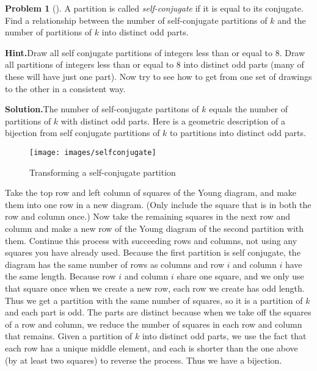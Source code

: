 \documentclass[10pt,]{book}
\theoremstyle{plain}
\theoremstyle{definition}
\newtheorem{activity}[project]{Problem}
\theoremstyle{definition}
\numberwithin{equation}{chapter}
\begin{document}
\begin{activity}[]\label{activity-165}
A partition is called \emph{self-conjugate} if it is equal to its conjugate. Find a relationship between the number of self-conjugate partitions of \(k\) and the number of partitions of \(k\) into distinct odd parts.%
\par\medskip\noindent%
\textbf{Hint.}\quad Draw all self conjugate partitions of integers less than or equal to 8.  Draw all partitions of integers less than or equal to 8 into distinct odd parts (many of these will have just one part). Now try to see how to get from one set of drawings to the other in a consistent way.%
\par\medskip\noindent%
\textbf{Solution.}\quad The number of self-conjugate partitons of \(k\) equals the number of partitions of \(k\) with distinct odd parts. Here is a geometric description of a bijection from self conjugate partitions of \(k\) to partitions into distinct odd parts.%
\begin{figure}
\centering
\texttt{[image: images/selfconjugate]}
\caption{Transforming a self-conjugate partition\label{selfconjugate-to-distinctodd}}
\end{figure}
Take the top row and left column of squares of the Young diagram, and make them into one row in a new diagram. (Only include the square that is in both the row and column once.) Now take the remaining squares in the next row and column and make a new row of the Young diagram of the second partition with them. Continue this process with succeeding rows and columns, not using any squares you have already used. Because the first partition is self conjugate, the diagram has the same number of rows as columns and row \(i\) and column \(i\) have the same length. Because row \(i\) and column \(i\) share one square, and we only use that square once when we create a new row, each row we create has odd length. Thus we get a partition with the same number of squares, so it is a partition of \(k\) and each part is odd. The parts are distinct because when we take off the squares of a row and column, we reduce the number of squares in each row and column that remains. Given a partition of \(k\) into distinct odd parts, we use the fact that each row has a unique middle element, and each is shorter than the one above (by at least two squares) to reverse the process. Thus we have a bijection.%
\end{activity}
\end{document}
